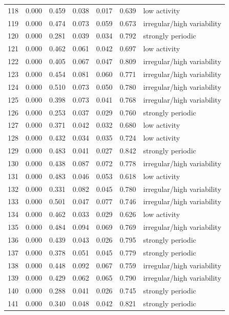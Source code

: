 \begin{longtable}{lrrrrrl}
118 & 0.000 & 0.459 & 0.038 & 0.017 & 0.639 & low activity \\
119 & 0.000 & 0.474 & 0.073 & 0.059 & 0.673 & irregular/high variability \\
120 & 0.000 & 0.281 & 0.039 & 0.034 & 0.792 & strongly periodic \\
121 & 0.000 & 0.462 & 0.061 & 0.042 & 0.697 & low activity \\
122 & 0.000 & 0.405 & 0.067 & 0.047 & 0.809 & irregular/high variability \\
123 & 0.000 & 0.454 & 0.081 & 0.060 & 0.771 & irregular/high variability \\
124 & 0.000 & 0.510 & 0.073 & 0.050 & 0.780 & irregular/high variability \\
125 & 0.000 & 0.398 & 0.073 & 0.041 & 0.768 & irregular/high variability \\
126 & 0.000 & 0.253 & 0.037 & 0.029 & 0.760 & strongly periodic \\
127 & 0.000 & 0.371 & 0.042 & 0.032 & 0.680 & low activity \\
128 & 0.000 & 0.432 & 0.034 & 0.035 & 0.724 & low activity \\
129 & 0.000 & 0.483 & 0.041 & 0.027 & 0.842 & strongly periodic \\
130 & 0.000 & 0.438 & 0.087 & 0.072 & 0.778 & irregular/high variability \\
131 & 0.000 & 0.483 & 0.046 & 0.053 & 0.618 & low activity \\
132 & 0.000 & 0.331 & 0.082 & 0.045 & 0.780 & irregular/high variability \\
133 & 0.000 & 0.501 & 0.047 & 0.077 & 0.746 & irregular/high variability \\
134 & 0.000 & 0.462 & 0.033 & 0.029 & 0.626 & low activity \\
135 & 0.000 & 0.484 & 0.094 & 0.069 & 0.769 & irregular/high variability \\
136 & 0.000 & 0.439 & 0.043 & 0.026 & 0.795 & strongly periodic \\
137 & 0.000 & 0.378 & 0.051 & 0.045 & 0.779 & strongly periodic \\
138 & 0.000 & 0.448 & 0.092 & 0.067 & 0.759 & irregular/high variability \\
139 & 0.000 & 0.429 & 0.062 & 0.065 & 0.790 & irregular/high variability \\
140 & 0.000 & 0.288 & 0.041 & 0.026 & 0.745 & strongly periodic \\
141 & 0.000 & 0.340 & 0.048 & 0.042 & 0.821 & strongly periodic \\

\end{longtable}
